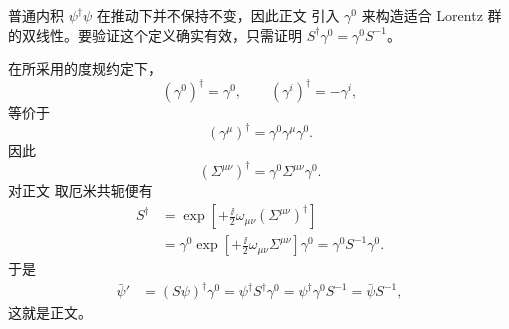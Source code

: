 \begin{derivation}

普通内积 $\psi^\dagger\psi$ 在推动下并不保持不变，因此正文 引入 $\gamma^0$ 来构造适合 Lorentz 群的双线性。要验证这个定义确实有效，只需证明 $S^\dagger\gamma^0=\gamma^0S^{-1}$。

在所采用的度规约定下，
\begin{equation*}
 (\gamma^0)^\dagger=\gamma^0,
 \qquad
 (\gamma^i)^\dagger=-\gamma^i,
\end{equation*}
等价于
\begin{equation*}
 (\gamma^\mu)^\dagger=\gamma^0\gamma^\mu\gamma^0.
\end{equation*}
因此
\begin{equation*}
 (\Sigma^{\mu\nu})^\dagger=\gamma^0\Sigma^{\mu\nu}\gamma^0.
\end{equation*}
对正文 取厄米共轭便有
\begin{align*}
 S^\dagger
 &=\exp\!\left[+\frac{\ii}{2}\omega_{\mu\nu}(\Sigma^{\mu\nu})^\dagger\right]\\
 &=\gamma^0\exp\!\left[+\frac{\ii}{2}\omega_{\mu\nu}\Sigma^{\mu\nu}\right]\gamma^0
 =\gamma^0S^{-1}\gamma^0.
\end{align*}
于是
\begin{align*}
 \bar\psi'
 &=(S\psi)^\dagger\gamma^0
 =\psi^\dagger S^\dagger\gamma^0
 =\psi^\dagger\gamma^0S^{-1}
 =\bar\psi S^{-1},
\end{align*}
这就是正文。
\end{derivation}

